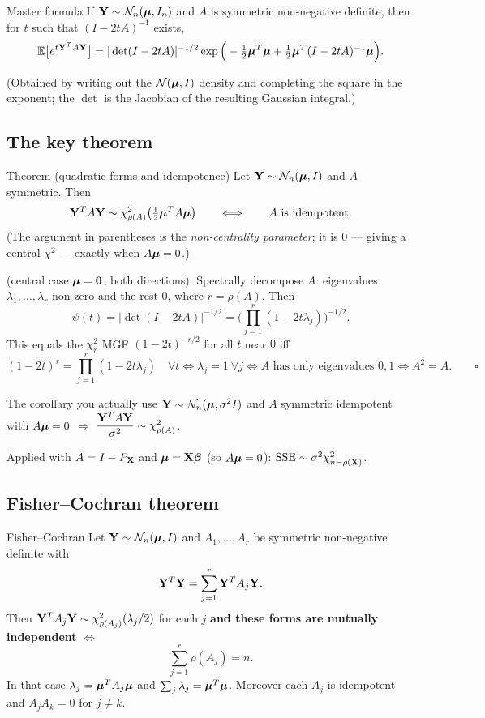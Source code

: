 \documentclass[11pt]{article}
\begin{document}
\begin{idea}{Master formula}
If $\mathbf{Y}\sim\mathcal{N}_n(\boldsymbol{\mu},I_n)$ and $A$ is symmetric non-negative definite, then for $t$ such that
$(I-2tA)^{-1}$ exists,
\[
  \mathbb{E}\big[e^{t\mathbf{Y}^TA\mathbf{Y}}\big]
  =|\det(I-2tA)|^{-1/2}\exp\Big(-\tfrac12\boldsymbol{\mu}^T\boldsymbol{\mu}+\tfrac12\boldsymbol{\mu}^T(I-2tA)^{-1}\boldsymbol{\mu}\Big) .
\]
\end{idea}
(Obtained by writing out the $\mathcal{N}(\boldsymbol{\mu},I)$ density and completing the square in the
exponent; the $\det$ is the Jacobian of the resulting Gaussian integral.)

\subsection{The key theorem}

\begin{idea}{Theorem (quadratic forms and idempotence)}
Let $\mathbf{Y}\sim\mathcal{N}_n(\boldsymbol{\mu},I)$ and $A$ symmetric. Then
\[
  \mathbf{Y}^TA\mathbf{Y} \sim \chi^2_{\rho(A)}\big(\tfrac12\boldsymbol{\mu}^TA\boldsymbol{\mu}\big)
  \qquad\Longleftrightarrow\qquad A \text{ is idempotent}.
\]
(The argument in parentheses is the \emph{non-centrality parameter}; it is $0$ --- giving a
central $\chi^2$ --- exactly when $A\boldsymbol{\mu}=0$.)
\end{idea}

\prf (central case $\boldsymbol{\mu}=\mathbf{0}$, both directions). Spectrally decompose $A$: eigenvalues
$\lambda_1,\dots,\lambda_r$ non-zero and the rest $0$, where $r=\rho(A)$. Then
\[
  \psi(t)=|\det(I-2tA)|^{-1/2}=\Big(\prod_{j=1}^r(1-2t\lambda_j)\Big)^{-1/2} .
\]
This equals the $\chi^2_r$ MGF $(1-2t)^{-r/2}$ for all $t$ near $0$ iff
\[
  (1-2t)^r=\prod_{j=1}^r(1-2t\lambda_j)\quad\forall t
  \iff \lambda_j=1 \ \forall j
  \iff A \text{ has only eigenvalues } 0,1
  \iff A^2=A. \qquad\square
\]

\begin{recipe}{The corollary you actually use}
$\mathbf{Y}\sim\mathcal{N}_n(\boldsymbol{\mu},\sigma^2I)$ and $A$ symmetric idempotent with $A\boldsymbol{\mu}=0$
$\Longrightarrow$ $\dfrac{\mathbf{Y}^TA\mathbf{Y}}{\sigma^2}\sim\chi^2_{\rho(A)}$.

Applied with $A=I-P_{\mathbf{X}}$ and $\boldsymbol{\mu}=\mathbf{X}\boldsymbol{\beta}$ (so $A\boldsymbol{\mu}=0$): $\mathrm{SSE}\sim\sigma^2\chi^2_{n-\rho(\mathbf{X})}$.
\end{recipe}

\subsection{Fisher--Cochran theorem}

\begin{idea}{Fisher--Cochran}
Let $\mathbf{Y}\sim\mathcal{N}_n(\boldsymbol{\mu},I)$ and $A_1,\dots,A_r$ be symmetric non-negative definite with
\[
  \mathbf{Y}^T\mathbf{Y}=\sum_{j=1}^r \mathbf{Y}^TA_j\mathbf{Y} .
\]
Then $\mathbf{Y}^TA_j\mathbf{Y}\sim\chi^2_{\rho(A_j)}(\lambda_j/2)$ for each $j$ \textbf{and these forms are
mutually independent} $\iff$
\[
  \sum_{j=1}^r\rho(A_j)=n .
\]
In that case $\lambda_j=\boldsymbol{\mu}^TA_j\boldsymbol{\mu}$ and $\sum_j\lambda_j=\boldsymbol{\mu}^T\boldsymbol{\mu}$. Moreover each $A_j$
is idempotent and $A_jA_k=0$ for $j\ne k$.
\end{idea}
\end{document}
